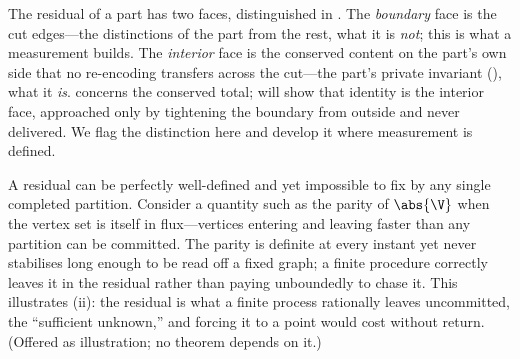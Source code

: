 \begin{remark}
\label{rem:two-faces}
The residual of a part has two faces, distinguished in .
The \emph{boundary} face is the cut edges---the distinctions of the part from the
rest, what it is \emph{not}; this is what a measurement builds. The
\emph{interior} face is the conserved content on the part's own side that no
re-encoding transfers across the cut---the part's private invariant
(), what it \emph{is}.  concerns
the conserved total;  will show that identity is the
interior face, approached only by tightening the boundary from outside and never
delivered. We flag the distinction here and develop it where measurement is
defined.
\end{remark}

\begin{remark}
\label{rem:cat-parity}
A residual can be perfectly well-defined and yet impossible to fix by any single
completed partition. Consider a quantity such as the parity of $\abs{\V}$ when
the vertex set is itself in flux---vertices entering and leaving faster than any
partition can be committed. The parity is definite at every instant yet never
stabilises long enough to be read off a fixed graph; a finite procedure
correctly leaves it in the residual rather than paying unboundedly to chase it.
This illustrates (ii): the residual is what a finite
process rationally leaves uncommitted, the ``sufficient unknown,'' and forcing it
to a point would cost without return. (Offered as illustration; no theorem
depends on it.)
\end{remark}
